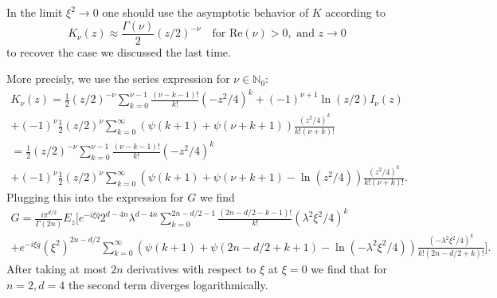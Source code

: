 \documentclass[a4paper,11pt]{article}
\begin{document}
In the limit \(\xi^2\rightarrow 0\) one should 
use the asymptotic behavior of \(K\) according to
\begin{equation}
K_\nu(z)\approx \frac{\Gamma(\nu)}{2} (z/2)^{-\nu} \quad \text{for Re}(\nu)>0, \text{ and } z\rightarrow 0 
\end{equation}
to recover the case we discussed the last time.

More precisly, we use the series expression for \(\nu\in\mathbb{N}_0\):
\begin{align}
  K_\nu(z)=\frac{1}{2}(z/2)^{-\nu}\sum_{k=0}^{\nu-1}\frac{(\nu-k-1)!}{k!}(-z^2/4)^k
  +(-1)^{\nu+1}\ln(z/2)I_{\nu}(z)\\
  +(-1)^\nu \frac{1}{2}(z/2)^\nu \sum_{k=0}^\infty (\psi(k+1)+\psi(\nu+k+1))\frac{(z^2/4)^k}{k!(\nu+k)!}\\
  =\frac{1}{2}(z/2)^{-\nu}\sum_{k=0}^{\nu-1}\frac{(\nu-k-1)!}{k!}(-z^2/4)^k\\
  +(-1)^\nu \frac{1}{2}(z/2)^\nu \sum_{k=0}^\infty (\psi(k+1)+\psi(\nu+k+1)-\ln(z^2/4))\frac{(z^2/4)^k}{k!(\nu+k)!}.
\end{align}
Plugging this into the expression for \(G\)
we find
\begin{align}
  G=\frac{i \pi^{d/2}}{\Gamma(2n)} E_z\Bigg[e^{-i\xi \overline{q}}2^{d-4n}\lambda^{d-4n}\sum_{k=0}^{2n-d/2-1}\frac{(2n-d/2-k-1)!}{k!}(\lambda^2\xi^2/4)^k\\
   +e^{-i\xi\overline{q}}(\xi^2)^{2n-d/2} \sum_{k=0}^\infty (\psi(k+1)+\psi(2n-d/2+k+1)-\ln(-\lambda^2 \xi^2/4))\frac{(-\lambda^2\xi^2/4)^k}{k!(2n-d/2+k)!} \Bigg].
\end{align}
After taking at most \(2n\) derivatives with
respect to \(\xi\) at \(\xi=0\) we find that
for \(n=2,d=4\) the second term diverges logarithmically.
\end{document}
